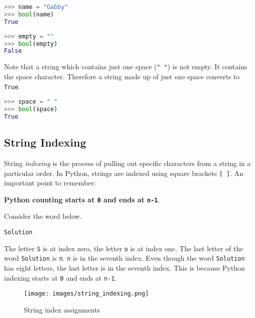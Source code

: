 \documentclass{book}
\makeatletter
\def\maxwidth{\ifdim\Gin@nat@width>\linewidth\linewidth
\else\Gin@nat@width\fi}
\let\Oldincludegraphics\includegraphics
\renewcommand{\includegraphics}[1]{\Oldincludegraphics[width=.8\maxwidth]{#1}}
\newcommand{\passthrough}[1]{#1}
\makeatother
\begin{document}
\begin{lstlisting}[language=Python]
>>> name = "Gabby"
>>> bool(name)
True
\end{lstlisting}

\begin{lstlisting}[language=Python]
>>> empty = ""
>>> bool(empty)
False
\end{lstlisting}

Note that a string which contains just one space
(\passthrough{\lstinline!" "!}) is not empty. It contains the space
character. Therefore a string made up of just one space converts to
\passthrough{\lstinline!True!}.

\begin{lstlisting}[language=Python]
>>> space = " "
>>> bool(space)
True
\end{lstlisting}
    




    
        \hypertarget{string-indexing}{%
\subsection{String Indexing}\label{string-indexing}}

String \emph{indexing} is the process of pulling out specific characters
from a string in a particular order. In Python, strings are indexed
using square brackets \passthrough{\lstinline![ ]!}. An important point
to remember:

\textbf{Python counting starts at \passthrough{\lstinline!0!} and ends
at \passthrough{\lstinline!n-1!}}.

Consider the word below.

\begin{lstlisting}
Solution
\end{lstlisting}

The letter \passthrough{\lstinline!S!} is at index zero, the letter
\passthrough{\lstinline!o!} is at index one. The last letter of the word
\passthrough{\lstinline!Solution!} is \passthrough{\lstinline!n!}.
\passthrough{\lstinline!n!} is in the seventh index. Even though the
word \passthrough{\lstinline!Solution!} has eight letters, the last
letter is in the seventh index. This is because Python indexing starts
at \passthrough{\lstinline!0!} and ends at
\passthrough{\lstinline!n-1!}.

\begin{figure}
\centering
\texttt{[image: images/string\_indexing.png]}
\caption{String index assignments}
\end{figure}
    
\end{document}
